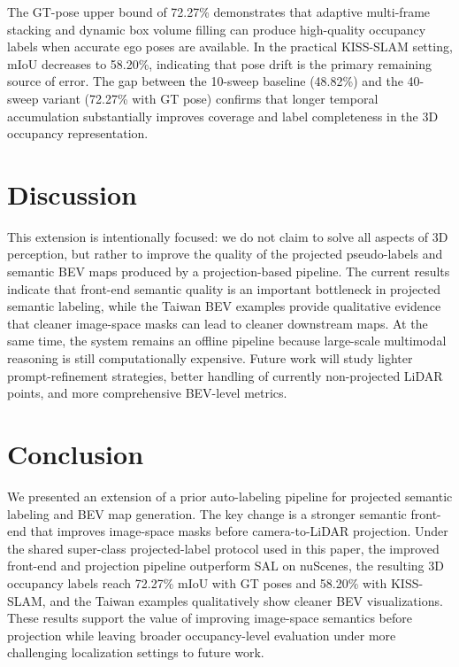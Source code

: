 \documentclass[conference]{IEEEtran}
\begin{document}
The GT-pose upper bound of 72.27\% demonstrates that adaptive multi-frame stacking and dynamic box volume filling can produce high-quality occupancy labels when accurate ego poses are available. In the practical KISS-SLAM setting, mIoU decreases to 58.20\%, indicating that pose drift is the primary remaining source of error. The gap between the 10-sweep baseline (48.82\%) and the 40-sweep variant (72.27\% with GT pose) confirms that longer temporal accumulation substantially improves coverage and label completeness in the 3D occupancy representation.

\section{Discussion}
This extension is intentionally focused: we do not claim to solve all aspects of 3D perception, but rather to improve the quality of the projected pseudo-labels and semantic BEV maps produced by a projection-based pipeline. The current results indicate that front-end semantic quality is an important bottleneck in projected semantic labeling, while the Taiwan BEV examples provide qualitative evidence that cleaner image-space masks can lead to cleaner downstream maps. At the same time, the system remains an offline pipeline because large-scale multimodal reasoning is still computationally expensive. Future work will study lighter prompt-refinement strategies, better handling of currently non-projected LiDAR points, and more comprehensive BEV-level metrics.

\section{Conclusion}
We presented an extension of a prior auto-labeling pipeline for projected semantic labeling and BEV map generation. The key change is a stronger semantic front-end that improves image-space masks before camera-to-LiDAR projection. Under the shared super-class projected-label protocol used in this paper, the improved front-end and projection pipeline outperform SAL on nuScenes, the resulting 3D occupancy labels reach 72.27\% mIoU with GT poses and 58.20\% with KISS-SLAM, and the Taiwan examples qualitatively show cleaner BEV visualizations. These results support the value of improving image-space semantics before projection while leaving broader occupancy-level evaluation under more challenging localization settings to future work.
\end{document}
